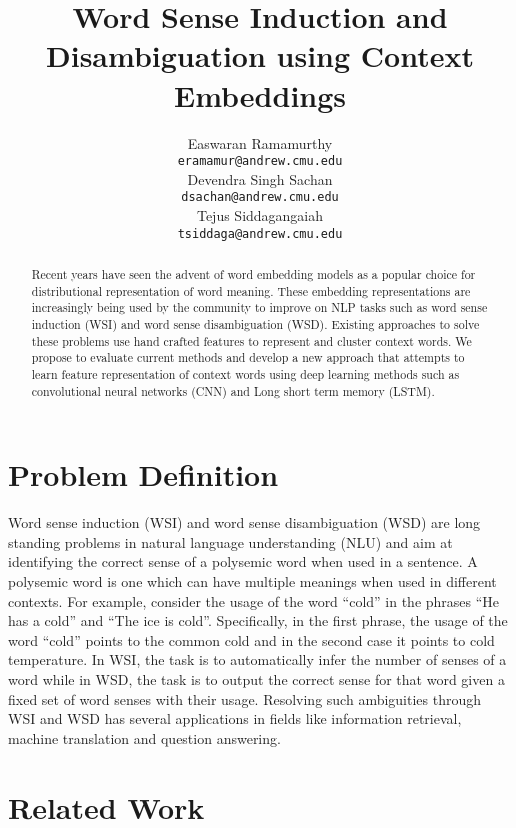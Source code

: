 \documentclass{article}
\title{Word Sense Induction and Disambiguation using Context Embeddings}
\author{
  Easwaran Ramamurthy \\
  \texttt{eramamur@andrew.cmu.edu} \\
   \And
  Devendra Singh Sachan \\
  \texttt{dsachan@andrew.cmu.edu} \\
  \AND
  Tejus Siddagangaiah \\
  \texttt{tsiddaga@andrew.cmu.edu} \\
}
\begin{document}

\maketitle

\begin{abstract}
Recent years have seen the advent of word embedding models as a popular choice for distributional representation of word meaning. These embedding representations are increasingly being used by the community to improve on NLP tasks such as word sense induction (WSI) and word sense disambiguation (WSD). Existing approaches to solve these problems use hand crafted features to represent and cluster context words. We propose to evaluate current methods and develop a new approach that attempts to learn feature representation of context words using deep learning methods such as convolutional neural networks (CNN) and Long short term memory (LSTM).
\end{abstract}

\section{Problem Definition}

Word sense induction (WSI) and word sense disambiguation (WSD) are long standing problems in natural language understanding (NLU) and aim at identifying the correct sense of a polysemic word when used in a sentence. A polysemic word is one which can have multiple meanings when used in different contexts. For example, consider the usage of the word “cold” in the phrases “He has a cold” and “The ice is cold”. Specifically, in the first phrase, the usage of the word “cold” points to the common cold and in the second case it points to cold temperature. In WSI, the task is to automatically infer the number of senses of a word while in WSD, the task is to output the correct sense for that word given a fixed set of word senses with their usage. Resolving such ambiguities through WSI and WSD has several applications in fields like information retrieval, machine translation and question answering.

\section{Related Work}
\end{document}

